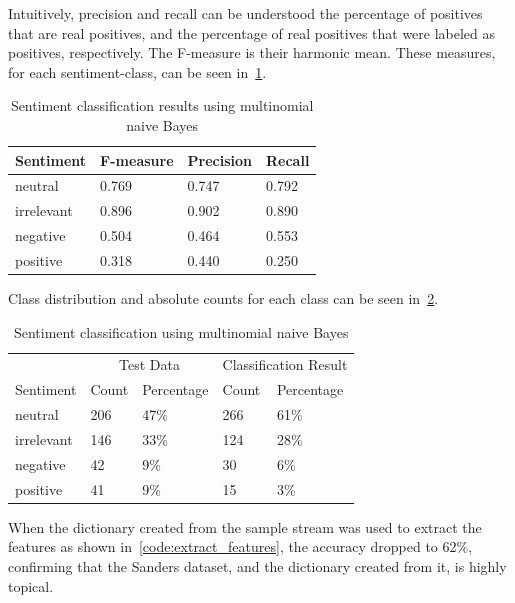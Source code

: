 Intuitively, precision and recall can be understood the percentage of positives that are real positives,
and the percentage of real positives that were labeled as positives, respectively.
The F-measure is their harmonic mean.
These measures, for each sentiment-class, can be seen in~\ref{tab:mnb_results}.

\begin{table}
    \caption{Sentiment classification results using multinomial naive Bayes}
    \label{tab:mnb_results}
    \centering
    \begin{tabular}{llll} %
        \toprule
        Sentiment
        & F-measure
        & Precision
        & Recall
        \\\midrule
        neutral & 0.769 & 0.747 & 0.792
        \\\midrule
        irrelevant & 0.896 & 0.902 & 0.890
        \\\midrule
        negative & 0.504 & 0.464 & 0.553
        \\\midrule
        positive & 0.318 & 0.440 & 0.250
        \\\bottomrule
    \end{tabular}
\end{table}

Class distribution and absolute counts for each class can be seen in~\ref{tab:naive_bayes_results}.

\begin{table}
    \caption{Sentiment classification using multinomial naive Bayes}
    \label{tab:naive_bayes_results}
    \centering
    \begin{tabular}{lllll} %
        \toprule
        & \multicolumn{2}{c}{Test Data} & \multicolumn{2}{c}{Classification Result}\\
        \cmidrule{2-3}
        \cmidrule{4-5}
        Sentiment
        & Count
        & Percentage
        & Count
        & Percentage
        \\\midrule
        neutral & 206 & 47\%  & 266 & 61\%
        \\\midrule
        irrelevant & 146 & 33\%  & 124 & 28\%
        \\\midrule
        negative & 42 & 9\%   & 30 & 6\%
        \\\midrule
        positive & 41 & 9\%   & 15 & 3\%
        \\\bottomrule
    \end{tabular}
\end{table}

When the dictionary created from the sample stream was used to extract the features as shown in~\ref{code:extract_features},
the accuracy dropped to 62\%, confirming that the Sanders dataset, and the dictionary created from it, is highly topical.

